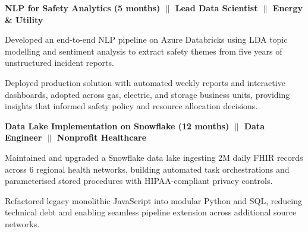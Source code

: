 \vspace{-0.1cm}

\vspace{0.05cm}

{\textbf{NLP for Safety Analytics (5 months) $\|$ Lead Data Scientist $\|$ Energy \& Utility}}
\begin{zitemize}
\item Developed an end-to-end NLP pipeline on Azure Databricks using LDA topic modelling and sentiment analysis to extract safety themes from five years of unstructured incident reports.
\item Deployed production solution with automated weekly reports and interactive dashboards, adopted across gas, electric, and storage business units, providing insights that informed safety policy and resource allocation decisions.
\end{zitemize}

{\textbf{Data Lake Implementation on Snowflake (12 months) $\|$ Data Engineer $\|$ Nonprofit Healthcare}}
\begin{zitemize}
\item Maintained and upgraded a Snowflake data lake ingesting 2M daily FHIR records across 6 regional health networks, building automated task orchestrations and parameterised stored procedures with HIPAA-compliant privacy controls.
\item Refactored legacy monolithic JavaScript into modular Python and SQL, reducing technical debt and enabling seamless pipeline extension across additional source networks.
\end{zitemize}